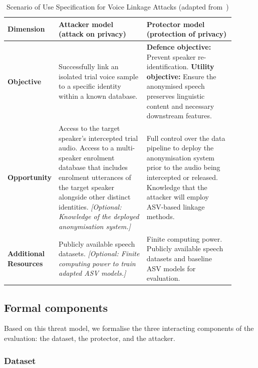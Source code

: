 \begin{table}[htbp]
\centering
\caption{Scenario of Use Specification for Voice Linkage Attacks (adapted from~\cite{rahman2024scenario})}
\label{tab:threat_model}
\renewcommand{\arraystretch}{1.3}
\begin{tabular}{|p{0.1\linewidth}|p{0.4\linewidth}|p{0.4\linewidth}|}
\hline
\textbf{Dimension} & \textbf{Attacker model (attack on privacy)} & \textbf{Protector model (protection of privacy)} \\ \hline
\textbf{Objective} & Successfully link an isolated trial voice sample to a specific identity within a known database. & \textbf{Defence objective:} Prevent speaker re-identification. \newline \textbf{Utility objective:} Ensure the anonymised speech preserves linguistic content and necessary downstream features. \\ \hline
\textbf{Opportunity} & Access to the target speaker's intercepted trial audio. Access to a multi-speaker enrolment database that includes enrolment utterances of the target speaker alongside other distinct identities. \newline \textit{[Optional: Knowledge of the deployed anonymisation system.]} & Full control over the data pipeline to deploy the anonymisation system prior to the audio being intercepted or released. Knowledge that the attacker will employ ASV-based linkage methods. \\ \hline
\textbf{Additional} \newline \textbf{Resources} & Publicly available speech datasets. \newline \textit{[Optional: Finite computing power to train adapted ASV models.]} & Finite computing power. Publicly available speech datasets and baseline ASV models for evaluation. \\ \hline
\end{tabular}

\end{table}


\subsection{Formal components}

Based on this threat model, we formalise the three interacting components of the evaluation: the dataset, the protector, and the attacker.

\subsubsection{Dataset}

